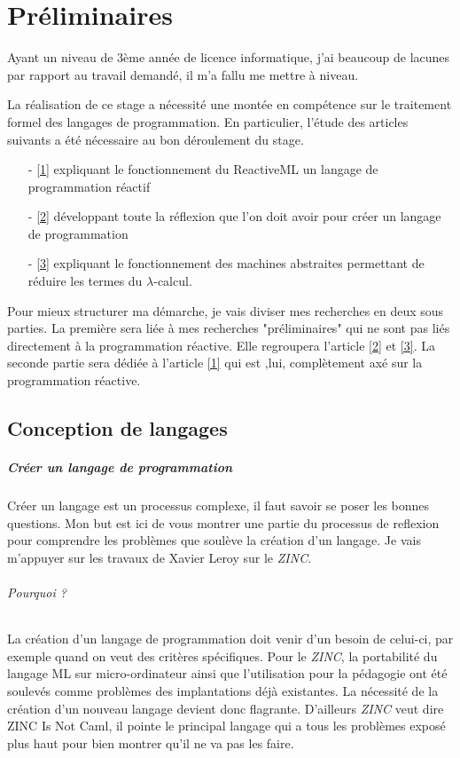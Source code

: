 \documentclass[10pt,a4paper]{report}
\begin{document}
\chapter{Préliminaires}
 Ayant un niveau de 3ème année de licence informatique, j'ai beaucoup de lacunes par rapport au travail demandé,
il m'a fallu me mettre à niveau.

La réalisation de ce stage a nécessité une montée en compétence sur le traitement formel des langages de programmation. En particulier, l'étude des articles
suivants a été nécessaire au bon déroulement du stage.
\begin{enumerate}
\item[-] \hyperref[ReactiveML]{[1]} expliquant le fonctionnement du ReactiveML un langage de programmation réactif
\item[-] \hyperref[ZINC]{[2]}  développant toute la réflexion que l'on doit avoir pour créer un langage de programmation
\item[-] \hyperref[Calculi]{[3]} expliquant le fonctionnement des machines abstraites permettant de réduire les termes du $\lambda $-calcul.
\end{enumerate}
Pour mieux structurer ma démarche, je vais diviser mes recherches en deux sous parties. La première sera liée à mes recherches "préliminaires" qui ne sont pas liés directement à la programmation réactive. Elle regroupera l'article \hyperref[ZINC]{[2]} et \hyperref[Calculi]{[3]}. La seconde partie sera dédiée à l'article \hyperref[ReactiveML]{[1]} qui est ,lui, complètement axé sur la programmation réactive. 

\section{Conception de langages}

\paragraph{Créer un langage de programmation}
Créer un langage est un processus complexe, il faut savoir se poser les bonnes questions. Mon but est ici de vous
montrer une partie du processus de reflexion pour comprendre les problèmes que soulève la création d'un langage.
Je vais m'appuyer sur les travaux de Xavier Leroy sur le \textit{ZINC}.
\medbreak

\subparagraph{Pourquoi ?} 
La création d'un langage de programmation doit venir d'un besoin de celui-ci, par exemple quand on veut des critères spécifiques.
Pour le \textit{ZINC}, la portabilité du langage ML sur micro-ordinateur ainsi que l'utilisation pour la pédagogie ont été soulevés
comme problèmes des implantations déjà existantes. La nécessité de la création d'un nouveau langage devient donc flagrante.
D'ailleurs \textit{ZINC} veut dire ZINC Is Not Caml, il pointe le principal langage qui a tous les problèmes exposé plus haut
pour bien montrer qu'il ne va pas les faire. 
\end{document}
